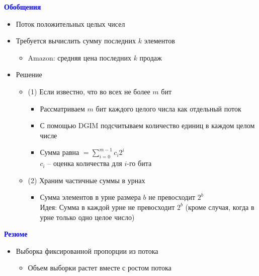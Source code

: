 \documentclass[landscape]{slides}
\begin{document}
\begin{normalsize}
\begin{slide}
\textbf{\textcolor{blue}{Обобщения}}

\begin{itemize}
\item Поток положительных целых чисел

\item Требуется вычислить сумму последних $k$ элементов
 
  \begin{itemize}
  \item Amazon: средняя цена последних $k$ продаж
  \end{itemize}

\item Решение

  \begin{itemize}
  \item (1) Если известно, что во всех не более $m$ бит

    \begin{itemize}
    \item Рассматриваем $m$ бит каждого целого числа как отдельный поток

    \item С помощью DGIM подсчитываем количество единиц в каждом целом числе

    \item Сумма равна $=\sum_{i=0}^{m-1} c_i 2^i$\\
$c_i$ -- оценка количества для $i$-го бита

    \end{itemize}

  \item (2) Храним частичные суммы в урнах

    \begin{itemize}
    \item Сумма элементов в урне размера $b$ не превосходит $2^b$\\

Идея: Сумма в каждой урне не превосходит $2^b$ (кроме случая, когда в урне только одно целое число)
    \end{itemize}
  \end{itemize}
\end{itemize}
\end{slide}


\begin{slide}
\textbf{\textcolor{blue}{Резюме}}

\begin{itemize}
\item Выборка фиксированной пропорции из потока
  \begin{itemize}
  \item Объем выборки растет вместе с ростом потока
  \end{itemize}


\end{itemize}
\end{slide}
\end{normalsize}
\end{document}
